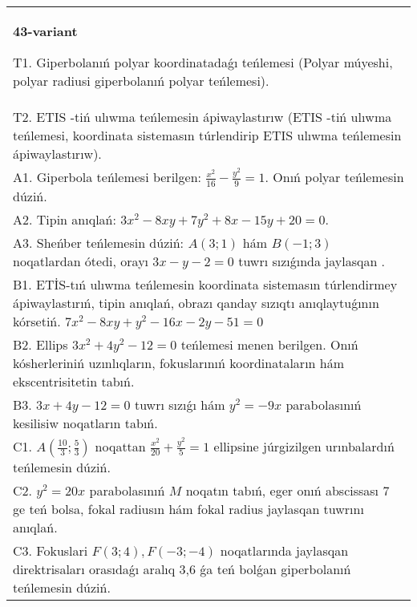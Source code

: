 \documentclass{article}
\begin{document}
\begin{tabular}{m{17cm}}
\textbf{43-variant}
\newline

T1. Giperbolanıń polyar koordinatadaǵı teńlemesi (Polyar múyeshi, polyar radiusi giperbolanıń polyar teńlemesi).\\

T2. ETIS -tiń ulıwma teńlemesin ápiwaylastırıw (ETIS -tiń ulıwma teńlemesi, koordinata sistemasın túrlendirip ETIS ulıwma teńlemesin ápiwaylastırıw).\\

A1. Giperbola teńlemesi berilgen: $\frac{x^{2}}{16}-\frac{y^{2}}{9}=1$. Onıń polyar teńlemesin dúziń.\\

A2. Tipin anıqlań: $3 x^{2}-8 xy+7 y^{2}+8 x-15 y+20=0$.\\

A3. Sheńber teńlemesin dúziń: $A (3;1) $ hám $B (-1;3) $ noqatlardan ótedi, orayı $3 x-y-2=0$ tuwrı sızıǵında jaylasqan .\\

B1. ETİS-tıń ulıwma teńlemesin koordinata sistemasın túrlendirmey ápiwaylastırıń, tipin anıqlań, obrazı qanday sızıqtı anıqlaytuǵının kórsetiń. $7x^{2} - 8xy + y^{2} - 16x - 2y - 51 = 0$  \\

B2. Ellips $3x^{2} + 4y^{2} - 12 = 0$ teńlemesi menen berilgen. Onıń kósherleriniń uzınlıqların, fokuslarınıń koordinataların hám ekscentrisitetin tabıń.  \\

B3. $3x + 4y - 12 = 0$ tuwrı sızıǵı hám $y^{2} = - 9x$ parabolasınıń kesilisiw noqatların tabıń.  \\

C1. $A(\frac{10}{3};\frac{5}{3})$ noqattan $\frac{x^{2}}{20} + \frac{y^{2}}{5} = 1$ ellipsine júrgizilgen urınbalardıń teńlemesin dúziń.  \\

C2. $y^{2} = 20x$ parabolasınıń $M$ noqatın tabıń, eger onıń abscissası 7 ge teń bolsa, fokal radiusın hám fokal radius jaylasqan tuwrını anıqlań.\\

C3. Fokuslari $F(3;4), F(-3;-4)$ noqatlarında jaylasqan direktrisaları orasıdaǵı aralıq 3,6 ǵa teń bolǵan giperbolanıń teńlemesin dúziń.  \\

\end{tabular}
\vspace{1cm}
\end{document}
